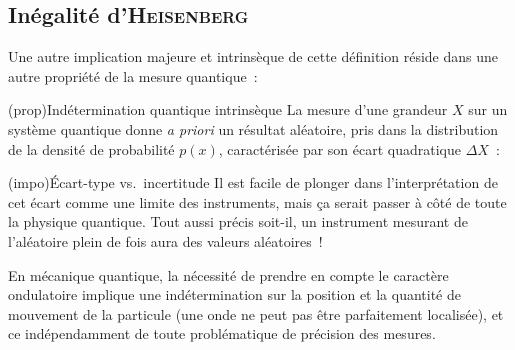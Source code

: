\documentclass[../../main/main.tex]{subfiles}
\begin{document}
\subsection{Inégalité d'\textsc{Heisenberg}}
\label{ssec:heis}
Une autre implication majeure et intrinsèque de cette définition réside dans une
autre propriété de la mesure quantique~:
\begin{tcb*}[sidebyside, righthand ratio=.5, list entry={\lte Indétermina$^\circ$ quantique intrinsèque}](prop){Indétermination quantique intrinsèque}
	La mesure d'une grandeur $X$ sur un système quantique donne \textit{a priori}
	un résultat aléatoire, pris dans la distribution de la densité de probabilité
	$p(x)$, caractérisée par son écart quadratique $\Delta{X}$~:
	\psw{%
		\[
			\Delta{X} = \sqrt{\moy{X^2} - \moy{X}^2}
		\]
	}%
	\vspace{-15pt}
	\tcblower
	\begin{center}
	\end{center}
\end{tcb*}

\begin{tcb*}(impo){Écart-type vs.\ incertitude}
	Il est facile de plonger dans l'interprétation de cet écart comme une limite
	des instruments, mais ça serait passer à côté de toute la physique quantique.
	Tout aussi précis soit-il, un instrument mesurant de l'aléatoire plein de fois
	aura des valeurs aléatoires~!
\end{tcb*}

En mécanique quantique, la nécessité de prendre en compte le caractère
ondulatoire implique une indétermination sur la position et la quantité de
mouvement de la particule (une onde ne peut pas être parfaitement localisée), et
ce indépendamment de toute problématique de précision des mesures.
\end{document}
